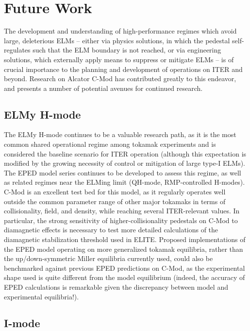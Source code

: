 \section{Future Work}\label{sec:conc_future}

The development and understanding of high-performance regimes which avoid large, deleterious ELMs -- either via physics solutions, in which the pedestal self-regulates such that the ELM boundary is not reached, or via engineering solutions, which externally apply means to suppress or mitigate ELMs -- is of crucial importance to the planning and development of operations on ITER and beyond.  Research on Alcator C-Mod has contributed greatly to this endeavor, and presents a number of potential avenues for continued research.

\subsection{ELMy H-mode}\label{subsec:conc_future_elmy}

The ELMy H-mode continues to be a valuable research path, as it is the most common shared operational regime among tokamak experiments and is considered the baseline scenario for ITER operation (although this expectation is modified by the growing necessity of control or mitigation of large type-I ELMs).  The EPED model series continues to be developed to assess this regime, as well as related regimes near the ELMing limit (\eg QH-mode, RMP-controlled H-modes).  C-Mod is an excellent test bed for this model, as it regularly operates well outside the common parameter range of other major tokamaks in terms of collisionality, field, and density, while reaching several ITER-relevant values.  In particular, the strong sensitivity of higher-collisionality pedestals on C-Mod to diamagnetic effects is necessary to test more detailed calculations of the diamagnetic stabilization threshold used in ELITE.  Proposed implementations of the EPED model operating on more generalized tokamak equilibria, rather than the up/down-symmetric Miller equilibria currently used, could also be benchmarked against previous EPED predictions on C-Mod, as the experimental shape used is quite different from the model equilibrium (indeed, the accuracy of EPED calculations is remarkable given the discrepancy between model and experimental equilibria!).

\subsection{I-mode}\label{subsec:conc_future_imode}

